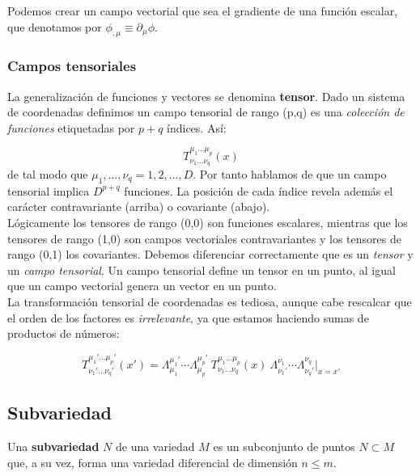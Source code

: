 \documentclass[12pt,a4paper]{book}
\numberwithin{equation}{section}
\numberwithin{figure}{section}
\begin{document}
Podemos crear un campo vectorial que sea el gradiente de una función escalar, que denotamos por $\phi_{,\mu} \equiv \partial_{\mu} \phi$. 

\subsubsection{Campos tensoriales}

La generalización de funciones y vectores se denomina \textbf{tensor}. Dado un sistema de coordenadas definimos un campo tensorial de rango (p,q) es una \textit{colección de funciones} etiquetadas por $p+q$ índices. Así:

\begin{equation}
T^{\mu_1\ldots\mu_p}_{\nu_1\ldots\nu_q} (x)
\end{equation}
de tal modo que $\mu_1,\ldots,\nu_q=1,2,...,D$. Por tanto hablamos de que un campo tensorial implica $D^{p+q}$ funciones. La posición de cada índice revela además el carácter contravariante (arriba) o covariante (abajo). \\

Lógicamente los tensores de rango (0,0) son funciones escalares, mientras que los tensores de rango (1,0) son campos vectoriales contravariantes y los tensores de rango (0,1) los covariantes. Debemos diferenciar correctamente que es un \textit{tensor} y un \textit{campo tensorial}. Un campo tensorial define un tensor en un punto, al igual que un campo vectorial genera un vector en un punto. \\

La transformación tensorial de coordenadas es tediosa, aunque cabe rescalcar que el orden de los factores es \textit{irrelevante}, ya que estamos haciendo sumas de productos de números:

\begin{equation}
T^{\mu_1'\ldots\mu_p'}_{\nu_1'\ldots\nu_q'} (x') =  \Lambda^{\mu_1'}_{\mu_1} \cdots  \Lambda^{\mu_p'}_{\mu_p} 
\ T^{\mu_1\ldots\mu_p}_{\nu_1\ldots\nu_q} (x) \ \Lambda^{\nu_1}_{\nu_1'}  \cdots  \Lambda^{\nu_q}_{\nu_q'}  \big\vert_{x=x'} 
\end{equation}

\subsection{Subvariedad}

Una \textbf{subvariedad} $N$ de una variedad $M$ es un subconjunto de puntos $N\subset M$ que, a su vez, forma una variedad diferencial de dimensión $n\leq m$. \\
\end{document}
